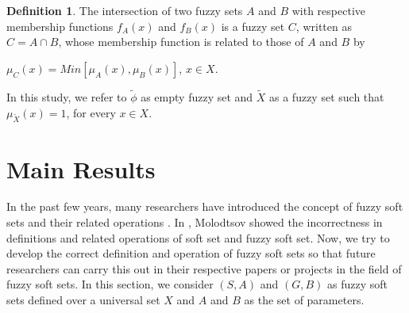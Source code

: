 \documentclass{article}
\theoremstyle{definition}
\newtheorem{definition}{Definition}[section]
\begin{document}
\begin{definition}\cite{5}
The intersection of two fuzzy sets $A$ and $B$ with respective membership functions $f_A(x)$ and $f_B(x)$ is a fuzzy set $C$, written as $C=A\cap B$, whose membership function is related to those of $A$ and $B$ by 
\begin{center}
    $\mu_C(x) = Min[\mu_A(x), \mu_B(x)]$, $x\in X$.\\
\end{center}
\end{definition}

In this study, we refer to $\tilde{\phi}$ as empty fuzzy set and $\tilde{X}$ as a fuzzy set such that $\mu_{\tilde{X}}(x)=1$, for every $x\in X$.

\section{Main Results}
In the past few years, many researchers have introduced the concept of fuzzy soft sets and their related operations \cite{7}. In \cite{2, 3}, Molodtsov showed the incorrectness in definitions and related operations of soft set and fuzzy soft set. Now, we try to develop the correct definition and operation of fuzzy soft sets so that future researchers can carry this out in their respective papers or projects in the field of fuzzy soft sets. In this section, we consider $(S,A)$ and $(G,B)$ as fuzzy soft sets defined over a universal set $X$ and $A$ and $B$ as the set of parameters. \\
\end{document}
